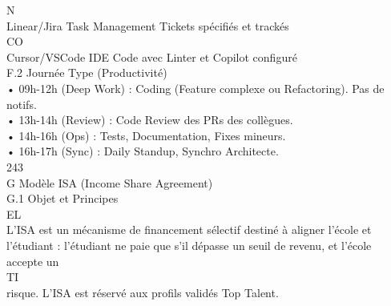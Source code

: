 \vspace{0.5em}
N\\
Linear/Jira     Task Management Tickets spécifiés et trackés\\
CO\\
Cursor/VSCode IDE               Code avec Linter et Copilot configuré\\
\vspace{0.5em}
\vspace{0.5em}
\vspace{0.5em}
F.2 Journée Type (Productivité)\\
• 09h-12h (Deep Work) : Coding (Feature complexe ou Refactoring). Pas de notifs.\\
\vspace{0.5em}
• 13h-14h (Review) : Code Review des PRs des collègues.\\
\vspace{0.5em}
• 14h-16h (Ops) : Tests, Documentation, Fixes mineurs.\\
\vspace{0.5em}
• 16h-17h (Sync) : Daily Standup, Synchro Architecte.\\
\vspace{0.5em}
\vspace{0.5em}
\vspace{0.5em}
\vspace{0.5em}
243\\
G \textbar{} Modèle ISA (Income Share Agreement)\\
\vspace{0.5em}
\vspace{0.5em}
G.1 Objet et Principes\\
\vspace{0.5em}
\vspace{0.5em}
\vspace{0.5em}
\vspace{0.5em}
EL\\
L’ISA est un mécanisme de financement sélectif destiné à aligner l’école et l’étudiant : l’étudiant ne paie que s’il dépasse un seuil de revenu, et l’école accepte un\\
\vspace{0.5em}
\vspace{0.5em}
\vspace{0.5em}
\vspace{0.5em}
TI\\
risque. L’ISA est réservé aux profils validés Top Talent.\\
\vspace{0.5em}
